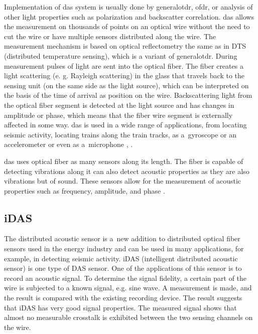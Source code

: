 Implementation of \ac{das} system is usually done by \ac{generalotdr}, \ac{ofdr}, or analysis of other light properties such as polarization and backscatter correlation. \ac{das} allows the measurement on thousands of points on an optical wire without the need to cut the wire or have multiple sensors distributed along the wire. The measurement mechanism is based on optical reflectometry the same as in DTS (distributed temperature sensing), which is a variant of \ac{generalotdr}. During measurement pulses of light are sent into the optical fiber. The fiber creates a light scattering (e. g. Rayleigh scattering) in the glass that travels back to the sensing unit (on the same side as the light source), which can be interpreted on the basis of the time of arrival as position on the wire. Backscattering light from the optical fiber segment is detected at the light source and has changes in amplitude or phase, which means that the fiber wire segment is externally affected in some way. \ac{das} is used in a wide range of applications, from locating seismic activity, locating trains along the train tracks, as a~gyroscope or an accelerometer or even as a~microphone \cite{WangYu2017RDVM}, \cite{kislov_das_newparadigm}.

\ac{das} uses optical fiber as many sensors along its length. The fiber is  capable of detecting vibrations along it can also detect acoustic properties as they are also vibrations but of sound. These sensors allow for the measurement of acoustic properties such as frequency, amplitude, and phase \cite{WangYu2017RDVM}. 




\subsection{iDAS}

The distributed acoustic sensor is a~new addition to distributed optical fiber sensors used in the energy industry and can be used in many applications, for example, in detecting seismic activity. iDAS (intelligent distributed acoustic sensor) is one type of DAS sensor. One of the applications of this sensor is to record an acoustic signal. To determine the signal fidelity, a certain part of the wire is subjected to a known signal, e.g. sine wave. A measurement is made, and the result is compared with the existing recording device. The result suggests that iDAS has very good signal properties. The measured signal shows that almost no measurable crosstalk is exhibited between the two sensing channels on the wire.

